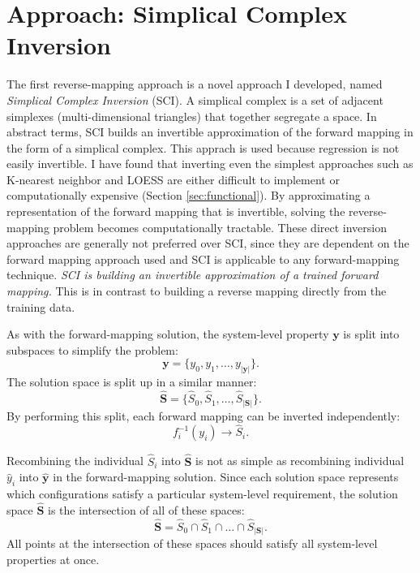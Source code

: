 \section{\fw Approach: Simplical Complex Inversion}
The first \fw reverse-mapping approach is a novel approach I developed, named \textit{Simplical Complex Inversion} (SCI).
A simplical complex is a set of adjacent simplexes (multi-dimensional triangles) that together segregate a space.
In abstract terms, SCI builds an invertible approximation of the forward mapping in the form of a simplical complex.
This apprach is used because regression is not easily invertible.
I have found that inverting even the simplest approaches such as K-nearest neighbor and LOESS are either difficult to implement or computationally expensive (Section \ref{sec:functional}).
By approximating a representation of the forward mapping that is invertible, solving the reverse-mapping problem becomes computationally tractable.
These direct inversion approaches are generally not preferred over SCI, since they are dependent on the forward mapping approach used and SCI is applicable to any forward-mapping technique.
\textit{SCI is building an invertible approximation of a trained forward mapping.}
This is in contrast to building a reverse mapping directly from the training data.

As with the forward-mapping solution, the system-level property $\mathbf y$ is split into subspaces to simplify the problem:
\[ \mathbf y = \{y_0, y_1, \ldots, y_{|\mathbf y|}\}. \]
The solution space is split up in a similar manner:
\[ \hat{\mathbf S} = \{\hat S_0, \hat S_1, \ldots, \hat S_{|\mathbf S|}\}. \]
By performing this split, each forward mapping can be inverted independently:
\[ f^{-1}_i(y_i) \rightarrow \hat S_i. \]

Recombining the individual $\hat S_i$ into $\hat{\mathbf S}$ is not as simple as recombining individual $\hat y_i$ into $\hat{\mathbf y}$ in the forward-mapping solution.
Since each solution space represents which configurations satisfy a particular system-level requirement, the solution space $\hat{\mathbf S}$ is the intersection of all of these spaces:
\[ \hat{\mathbf S} = \hat S_0 \cap \hat S_1 \cap \ldots \cap \hat S_{|\mathbf S|}.\]
All points at the intersection of these spaces should satisfy all system-level properties at once.

